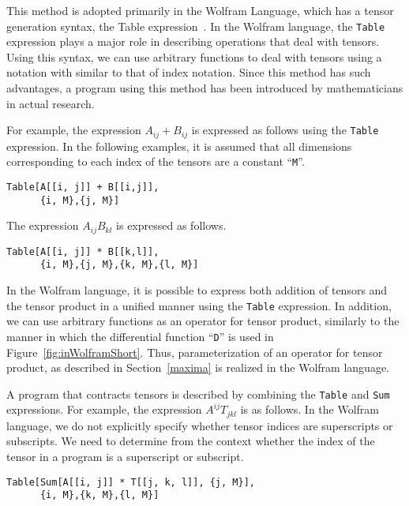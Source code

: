 \documentclass[acmlarge]{acmart}
\begin{document}
This method is adopted primarily in the Wolfram Language, which has a tensor generation syntax, the Table expression~\cite{wolframTable}.
In the Wolfram language, the \texttt{Table} expression plays a major role in describing operations that deal with tensors.
Using this syntax, we can use arbitrary functions to deal with tensors using a notation with similar to that of index notation.
Since this method has such advantages, a program using this method has been introduced by mathematicians in actual research.~\cite{maeda2016geometry,maeda2010program}

For example, the expression $A_{ij} + B_{ij}$ is expressed as follows using the \texttt{Table} expression.
In the following examples, it is assumed that all dimensions corresponding to each index of the tensors are a constant ``\texttt{M}''.

{\footnotesize
\begin{verbatim}
Table[A[[i, j]] + B[[i,j]],
      {i, M},{j, M}]
\end{verbatim}
}

The expression $A_{ij} B_{kl}$ is expressed as follows.

{\footnotesize
\begin{verbatim}
Table[A[[i, j]] * B[[k,l]],
      {i, M},{j, M},{k, M},{l, M}]
\end{verbatim}
}

In the Wolfram language, it is possible to express both addition of tensors and the tensor product in a unified manner using the \texttt{Table} expression.
In addition, we can use arbitrary functions as an operator for tensor product, similarly to the manner in which the differential function ``\texttt{D}'' is used in Figure~\ref{fig:inWolframShort}.
Thus, parameterization of an operator for tensor product, as described in Section~\ref{maxima} is realized in the Wolfram language.

A program that contracts tensors is described by combining the \texttt{Table} and \texttt{Sum} expressions.
For example, the expression $A^{ij} T_{jkl}$ is as follows.
In the Wolfram language, we do not explicitly specify whether tensor indices are superscripts or subscripts.
We need to determine from the context whether the index of the tensor in a program is a superscript or subscript.

{\footnotesize
\begin{verbatim}
Table[Sum[A[[i, j]] * T[[j, k, l]], {j, M}],
      {i, M},{k, M},{l, M}]
\end{verbatim}
}
\end{document}
